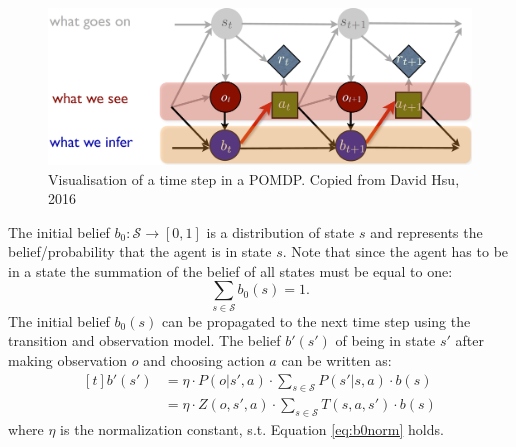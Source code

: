 \begin{figure}
    \centering
    \includegraphics[width=\textwidth]{Report/images/POMDP.png}
    \caption{Visualisation of a time step in a POMDP. Copied from David Hsu, 2016~\cite{POMDPpresi}}
    \label{fig:POMDP}
\end{figure}


The initial belief $b_0:\mathcal{S}\rightarrow [0, 1]$ is a distribution of state $s$ and represents the belief/probability that the agent is in state $s$. Note that since the agent has to be in a state the summation of the belief of all states must be equal to one:
\begin{equation}\label{eq:b0norm}
    \sum_{s\in\mathcal{S}} b_0(s)=1.
\end{equation}
The initial belief $b_0(s)$ can be propagated to the next time step using the transition and observation model. The belief $b'(s')$ of being in state $s'$ after making observation $o$ and choosing action $a$ can be written as:
%
\begin{equation}\label{eq:bdash}
    \begin{aligned}[t]
    b'(s') &= \eta \cdot P(o|s', a)\cdot \sum_{s\in\mathcal{S}}P(s'|s,a)\cdot b(s) \\
    &=\eta \cdot Z(o,s',a)\cdot \sum_{s\in\mathcal{S}}T(s,a,s')\cdot b(s)
    \end{aligned}
\end{equation}
%
where $\eta$ is the normalization constant, s.t. Equation \ref{eq:b0norm} holds.\\

